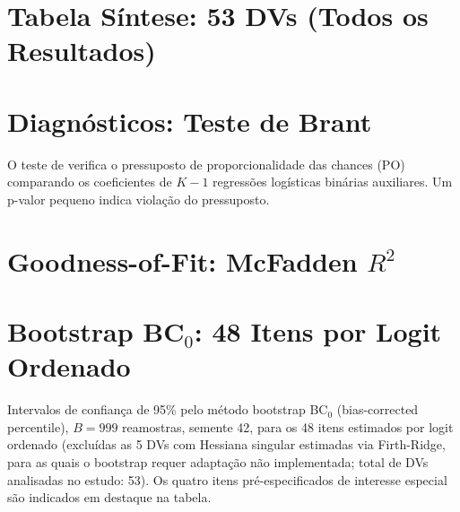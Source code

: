 \begin{apendicesenv}


\chapter{Tabela Síntese: 53 DVs (Todos os Resultados)}
\label{apendice:tab_sintese_v2}




\chapter{Diagnósticos: Teste de Brant}
\label{apendice:tab_brant_v2}

O teste de  verifica o pressuposto de proporcionalidade das chances (PO) comparando os coeficientes de $K-1$ regressões logísticas binárias auxiliares. Um p-valor pequeno indica violação do pressuposto.



\chapter{Goodness-of-Fit: McFadden $R^2$}
\label{apendice:tab_gof_v2}



\chapter{Bootstrap BC\texorpdfstring{$_0$}{0}: 48 Itens por Logit Ordenado}
\label{apendice:tab_bootstrap_v2}

Intervalos de confiança de 95\% pelo método bootstrap BC$_0$ (bias-corrected percentile), $B = 999$ reamostras, semente 42, para os 48 itens estimados por logit ordenado (excluídas as 5 DVs com Hessiana singular estimadas via Firth-Ridge, para as quais o bootstrap requer adaptação não implementada; total de DVs analisadas no estudo: 53). Os quatro itens pré-especificados de interesse especial são indicados em destaque na tabela.


\end{apendicesenv}
